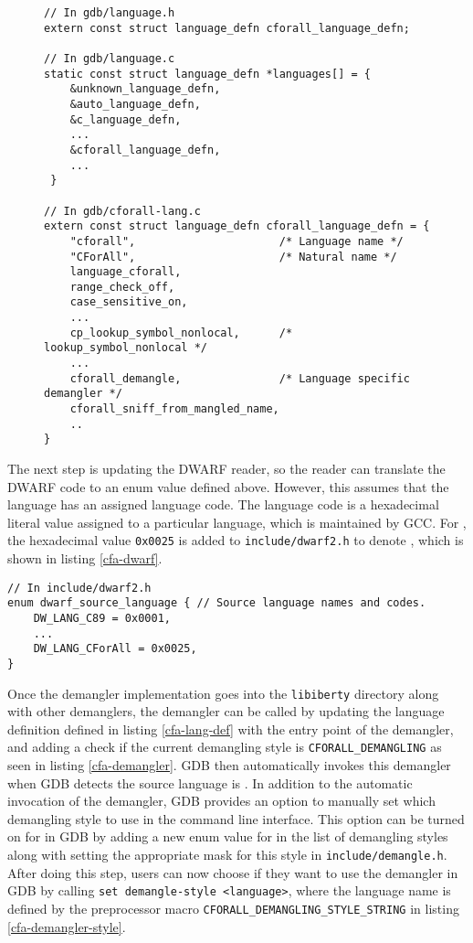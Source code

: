\begin{figure}
\begin{lstlisting}[style=C++, caption={Language definition declaration for
\CFA}, label={cfa-lang-def}, basicstyle=\small]
// In gdb/language.h
extern const struct language_defn cforall_language_defn;

// In gdb/language.c
static const struct language_defn *languages[] = {
    &unknown_language_defn,
    &auto_language_defn,
    &c_language_defn,
    ...
    &cforall_language_defn,
    ...
 }

// In gdb/cforall-lang.c
extern const struct language_defn cforall_language_defn = {
    "cforall",                      /* Language name */
    "CForAll",                      /* Natural name */
    language_cforall,
    range_check_off,
    case_sensitive_on,
    ...
    cp_lookup_symbol_nonlocal,      /* lookup_symbol_nonlocal */
    ...
    cforall_demangle,               /* Language specific demangler */
    cforall_sniff_from_mangled_name,
    ..
}
\end{lstlisting}
\end{figure}

The next step is updating the DWARF reader, so the reader can translate the
DWARF code to an enum value defined above. However, this assumes that the
language has an assigned language code.  The language code is a hexadecimal
literal value assigned to a particular language, which is maintained by
GCC. For \CFA, the hexadecimal value \verb|0x0025| is added to
\verb|include/dwarf2.h| to denote \CFA, which is shown in listing
\ref{cfa-dwarf}.
\begin{lstlisting}[style=C++, caption={DWARF language code for \CFA},
label={cfa-dwarf}, basicstyle=\small]
// In include/dwarf2.h
enum dwarf_source_language { // Source language names and codes.
    DW_LANG_C89 = 0x0001,
    ...
    DW_LANG_CForAll = 0x0025,
}
\end{lstlisting}

Once the demangler implementation goes into the \verb|libiberty| directory
along with other demanglers, the demangler can be called by updating the
language definition defined in listing \ref{cfa-lang-def} with the entry point
of the \CFAS demangler, and adding a check if the current demangling style is
\verb|CFORALL_DEMANGLING| as seen in listing \ref{cfa-demangler}. GDB then
automatically invokes this \CFAS demangler when GDB detects the source language
is \CFA. In addition to the automatic invocation of the demangler, GDB provides
an option to manually set which demangling style to use in the command line
interface.  This option can be turned on for \CFAS in GDB by adding a new enum
value for \CFAS in the list of demangling styles along with setting the
appropriate mask for this style in \verb|include/demangle.h|. After doing this
step, users can now choose if they want to use the \CFAS demangler in GDB by
calling \verb|set demangle-style <language>|, where the language name is
defined by the preprocessor macro \verb|CFORALL_DEMANGLING_STYLE_STRING| in
listing \ref{cfa-demangler-style}.

